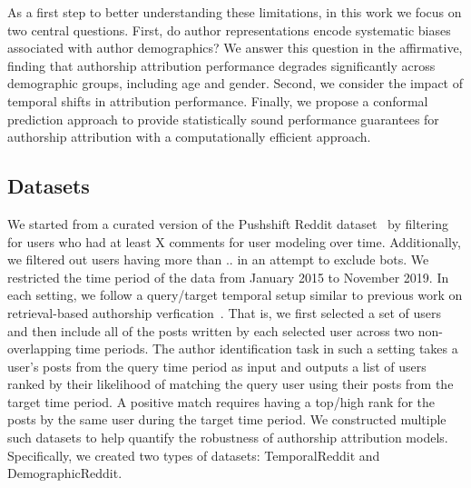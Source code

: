 As a first step to better understanding these limitations, in this work we focus on two central questions. First, do author representations encode systematic biases associated with author demographics? 
We answer this question in the affirmative, finding that authorship attribution performance degrades significantly across demographic groups, including age and gender. 
Second, we consider the impact of temporal shifts in attribution performance.
Finally, we propose a conformal prediction approach to provide statistically sound performance guarantees for authorship attribution with a computationally efficient approach.

\subsection{Datasets}
We started from a curated version of the Pushshift Reddit dataset~\cite{baumgartner2020pushshift} by filtering for users who had at least X comments for user modeling over time. 
Additionally, we filtered out users having more than .. in an attempt to exclude bots. 
We restricted the time period of the data from January 2015 to November 2019.
In each setting, we follow a query/target temporal setup similar to previous work on retrieval-based authorship verfication~\cite{andrews2019learning,khan2021deep}.
That is, we first selected a set of users and then include all of the posts written by each selected user across two non-overlapping time periods.
The author identification task in such a setting takes a user's posts from the query time period as input and outputs a list of users ranked by their likelihood of matching the query user using their posts from the target time period.
A positive match requires having a top/high rank for the posts by the same user during the target time period.
We constructed multiple such datasets to help quantify the robustness of authorship attribution models.
Specifically, we created two types of datasets: TemporalReddit and DemographicReddit.


